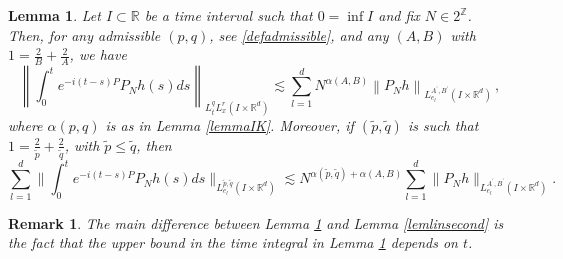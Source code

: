 \documentclass[10pt,leqno]{amsart}
\newtheorem{lem}[thm]{Lemma} %
\newtheorem{rmq}[thm]{Remark} %
\newcommand{\R}{\mathbb{R}} %
\numberwithin{equation}{section}
\newcommand{\Z}{\mathbb{Z}}
\begin{document}
\begin{lem}
\label{lemlin}
 Let $I\subset \R$ be a time interval such that $0=\inf I$ and fix $N\in 2^\Z$. Then, for any admissible $(p,q)$, see \eqref{defadmissible}, and any $(A, B)$ with $1= \frac{2}{B} +\frac{2}{A}$, we have
$$\left\|\int_0^t e^{-i(t-s) P} P_N h(s) ds\right\|_{L_t^q L_x^r (I\times \R^d )} \lesssim  \sum_{l=1}^d N^{\alpha (A,B)} \left\|P_N h\right\|_{L_{e_l}^{A^\prime ,B^\prime} (I\times \R^d )} \,,$$
where $\alpha(p, q)$ is as in Lemma \ref{lemmaIK}.
Moreover, if $(\tilde{p},\tilde{q}) $ is such that $1= \frac{2}{\tilde{p}} +\frac{2}{\tilde{q}}$, with $\tilde{p} \leq \tilde{q}$, then
$$ \sum_{l=1}^d\Big\|\int_0^t e^{-i(t-s) P} P_N h(s) ds \Big\|_{L_{e_l}^{\tilde{p},\tilde{q}} (I\times \R^d)}\lesssim 
N^{\alpha(\tilde{p},\tilde{q}) + \alpha (A,B)} \sum_{l=1}^d  \|P_N h\|_{L_{e_l}^{A^\prime ,B^\prime} (I\times \R^d )}. $$
\end{lem}
\begin{rmq}

\textnormal{
The main difference between 
 Lemma \ref{lemlin} and Lemma \ref{lemlinsecond} is the fact that the upper bound in the time integral in Lemma \ref{lemlin}   depends on $t$.
}
\end{rmq}
\end{document}
